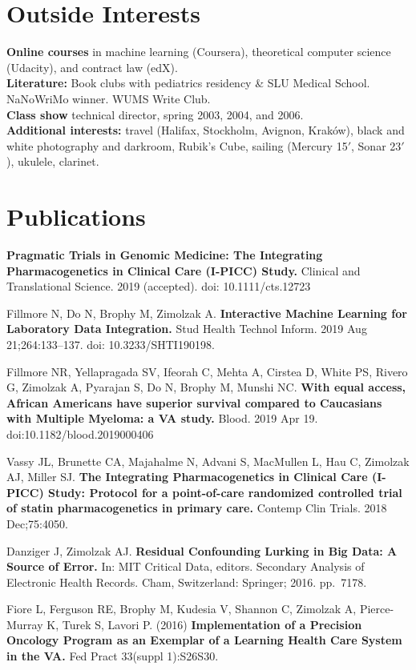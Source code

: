 \documentclass[10pt]{article}
\begin{document}
\section*{Outside Interests}

\textbf{Online courses} in machine learning (Coursera), theoretical
computer science (Udacity), and contract law (edX).\\
\textbf{Literature:} Book clubs with pediatrics residency \& SLU
Medical School. NaNoWriMo winner. WUMS Write Club.\\
\textbf{Class show} technical director, spring 2003, 2004, and 2006.\\
\textbf{Additional interests:} travel (Halifax, Stockholm, Avignon,
Krak\'ow), black and white photography and darkroom, Rubik's Cube,
sailing (Mercury 15$'$, Sonar 23$'$), ukulele, clarinet.

\section*{Publications}

\textbf{Pragmatic Trials in Genomic Medicine: The Integrating
  Pharmacogenetics in Clinical Care (I-PICC) Study.} Clinical and
Translational Science. 2019 (accepted). doi: 10.1111/cts.12723

Fillmore N, Do N, Brophy M, Zimolzak A. \textbf{Interactive Machine
  Learning for Laboratory Data Integration.} Stud Health Technol
Inform. 2019 Aug 21;264:133--137. doi: 10.3233/SHTI190198.

Fillmore NR, Yellapragada SV, Ifeorah C, Mehta A, Cirstea D, White PS,
Rivero G, Zimolzak A, Pyarajan S, Do N, Brophy M, Munshi NC.
\textbf{With equal access, African Americans have superior survival
  compared to Caucasians with Multiple Myeloma: a VA study.} Blood.
2019 Apr 19. doi:10.1182/blood.2019000406

Vassy JL, Brunette CA, Majahalme N, Advani S, MacMullen L, Hau C,
Zimolzak AJ, Miller SJ. \textbf{The Integrating Pharmacogenetics in
  Clinical Care (I-PICC) Study: Protocol for a point-of-care
  randomized controlled trial of statin pharmacogenetics in primary
  care.} Contemp Clin Trials. 2018 Dec;75:40\ndash{}50.

Danziger J, Zimolzak AJ. \textbf{Residual Confounding Lurking in Big
  Data: A Source of Error.} In: MIT Critical Data, editors. Secondary
Analysis of Electronic Health Records. Cham, Switzerland: Springer;
2016. pp.\ 71\ndash{}78.

Fiore L, Ferguson RE, Brophy M, Kudesia V, Shannon C, Zimolzak A,
Pierce-Murray K, Turek S, Lavori P. (2016) \textbf{Implementation of a
  Precision Oncology Program as an Exemplar of a Learning Health Care
  System in the VA.} Fed Pract 33(suppl 1):S26\ndash{}S30.
\end{document}
